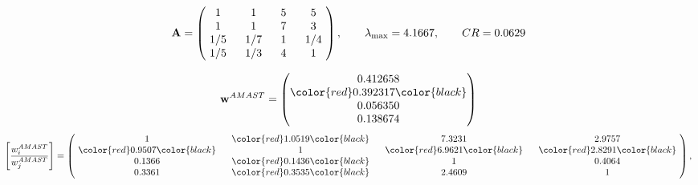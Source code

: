 \begin{example}
\begin{equation*}
\mathbf{A} =
\begin{pmatrix}
$\,\,$ 1 $\,\,$ & $\,\,$1$\,\,$ & $\,\,$5$\,\,$ & $\,\,$5 $\,\,$ \\
$\,\,$ 1 $\,\,$ & $\,\,$ 1 $\,\,$ & $\,\,$7$\,\,$ & $\,\,$3 $\,\,$ \\
$\,\,$ 1/5$\,\,$ & $\,\,$ 1/7$\,\,$ & $\,\,$ 1 $\,\,$ & $\,\,$ 1/4 $\,\,$ \\
$\,\,$ 1/5$\,\,$ & $\,\,$ 1/3$\,\,$ & $\,\,$4$\,\,$ & $\,\,$ 1  $\,\,$ \\
\end{pmatrix},
\qquad
\lambda_{\max} =
4.1667,
\qquad
CR = 0.0629
\end{equation*}

\begin{equation*}
\mathbf{w}^{AMAST} =
\begin{pmatrix}
0.412658\\
\color{red} 0.392317\color{black} \\
0.056350\\
0.138674
\end{pmatrix}\end{equation*}
\begin{equation*}
\left[ \frac{{w}^{AMAST}_i}{{w}^{AMAST}_j} \right] =
\begin{pmatrix}
$\,\,$ 1 $\,\,$ & $\,\,$\color{red} 1.0519\color{black} $\,\,$ & $\,\,$7.3231$\,\,$ & $\,\,$2.9757$\,\,$ \\
$\,\,$\color{red} 0.9507\color{black} $\,\,$ & $\,\,$ 1 $\,\,$ & $\,\,$\color{red} 6.9621\color{black} $\,\,$ & $\,\,$\color{red} 2.8291\color{black}   $\,\,$ \\
$\,\,$0.1366$\,\,$ & $\,\,$\color{red} 0.1436\color{black} $\,\,$ & $\,\,$ 1 $\,\,$ & $\,\,$0.4064 $\,\,$ \\
$\,\,$0.3361$\,\,$ & $\,\,$\color{red} 0.3535\color{black} $\,\,$ & $\,\,$2.4609$\,\,$ & $\,\,$ 1  $\,\,$ \\
\end{pmatrix},
\end{equation*}


\end{example}
